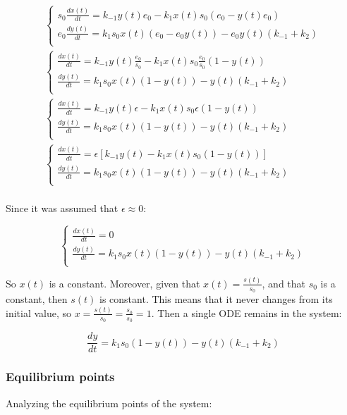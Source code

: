   \begin{align*}
    \begin{cases}
      s_0\frac{dx(t)}{dt} = k_{-1}y(t)e_0 - k_1x(t)s_0(e_0-y(t)e_0)\\
      e_0\frac{dy(t)}{dt} = k_{1}s_0x(t)(e_0-e_0y(t)) - e_0y(t)(k_{-1}+k_2)\\
    \end{cases}\\
    \begin{cases}
      \frac{dx(t)}{dt} = k_{-1}y(t)\frac{e_0}{s_0} - k_1x(t)s_0\frac{e_0}{s_0}(1-y(t))\\
      \frac{dy(t)}{dt} = k_{1}s_0x(t)(1-y(t)) - y(t)(k_{-1}+k_2)\\
    \end{cases}\\
    \begin{cases}
      \frac{dx(t)}{dt} = k_{-1}y(t)\epsilon - k_1x(t)s_0\epsilon(1-y(t))\\
      \frac{dy(t)}{dt} = k_{1}s_0x(t)(1-y(t)) - y(t)(k_{-1}+k_2)\\
    \end{cases}\\
    \begin{cases}
      \frac{dx(t)}{dt} = \epsilon[k_{-1}y(t) - k_1x(t)s_0(1-y(t))]\\
      \frac{dy(t)}{dt} = k_{1}s_0x(t)(1-y(t)) - y(t)(k_{-1}+k_2)\\
    \end{cases}\\
  \end{align*}

  Since it was assumed that $\epsilon\approx 0$:

  $$\begin{cases}
    \frac{dx(t)}{dt} = 0\\
    \frac{dy(t)}{dt} = k_1s_0x(t)(1-y(t)) - y(t)(k_{-1}+k_2)\\
  \end{cases}$$

  So $x(t)$ is a constant.
  Moreover, given that $x(t) = \frac{s(t)}{s_0}$, and that $s_0$ is a constant, then $s(t)$ is constant.
  This means that it never changes from its initial value, so $x = \frac{s(t)}{s_0} = \frac{s_0}{s_0} = 1$.
  Then a single ODE remains in the system:

  $$\frac{dy}{dt} = k_1s_0(1-y(t)) - y(t)(k_{-1}+k_2)$$

    \subsubsection{Equilibrium points}
    Analyzing the equilibrium points of the system:

